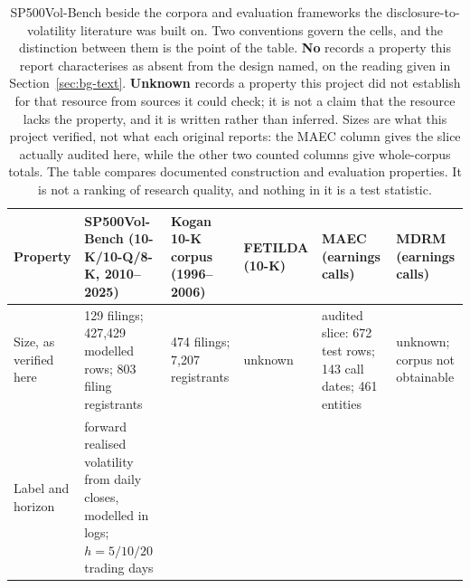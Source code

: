 \begin{table}[p]
  \centering
  \caption[The benchmark beside the corpora it joins]{SP500Vol-Bench beside the
  corpora and evaluation frameworks the disclosure-to-volatility literature was
  built on. Two conventions govern the cells, and the distinction between them is
  the point of the table. \textbf{No} records a property this report
  characterises as absent from the design named, on the reading given in
  Section~\ref{sec:bg-text}.
  \textbf{Unknown} records a property this project did not establish for that
  resource from sources it could check; it is not a claim that the resource lacks
  the property, and it is written rather than inferred. Sizes are what this
  project verified, not what each original reports: the MAEC column gives the
  slice actually audited here, while the other two counted columns give
  whole-corpus totals. The table compares documented construction and evaluation
  properties. It is not a ranking of research quality, and nothing in it is a
  test statistic.}
  \label{tab:app-benchmarks}
  \singlespacing\footnotesize
  \setlength{\tabcolsep}{2pt}
  \begin{tabular}{@{}>{\raggedright\arraybackslash}p{2.45cm}>{\raggedright\arraybackslash}p{2.85cm}>{\raggedright\arraybackslash}p{2.5cm}>{\raggedright\arraybackslash}p{1.85cm}>{\raggedright\arraybackslash}p{2.35cm}>{\raggedright\arraybackslash}p{2.15cm}@{}}
    \toprule
    Property & SP500Vol-Bench (10-K/10-Q/8-K, 2010--2025) & Kogan 10-K corpus (1996--2006) & FETILDA (10-K) & MAEC (earnings calls) & MDRM (earnings calls) \\
    \midrule
    Size, as verified here
      & 144{,}129 filings; 427{,}429 modelled rows; 803 filing registrants
      & 30{,}474 filings; 7{,}207 registrants
      & unknown
      & audited slice: 672 test rows; 143 call dates; 461 entities
      & unknown; corpus not obtainable \\ %
    \addlinespace[2pt]
    Label and horizon
      & forward realised volatility from daily closes, modelled in logs; $h = 5/10/20$ trading days

\end{tabular}
\end{table}
